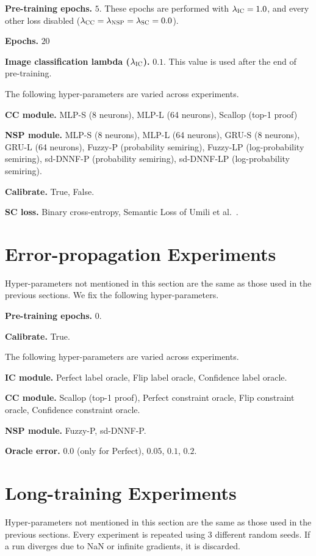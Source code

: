 \noindent\textbf{Pre-training epochs.} $5$. These epochs are performed with $\lambda_\textsc{IC} = 1.0$, and every other loss disabled ($\lambda_\textsc{CC} = \lambda_\textsc{NSP} = \lambda_\textsc{SC} = 0.0$).

\noindent\textbf{Epochs.} $20$

\noindent\textbf{Image classification lambda ($\lambda_\textsc{IC}$).} $0.1$. This value is used after the end of pre-training.


The following hyper-parameters are varied across experiments.

\noindent\textbf{\textsc{CC} module.} MLP-S (8 neurons), MLP-L (64 neurons), Scallop (top-1 proof)

\noindent\textbf{\textsc{NSP} module.} MLP-S (8 neurons), MLP-L (64 neurons), GRU-S (8 neurons), GRU-L (64 neurons), Fuzzy-P (probability semiring), Fuzzy-LP (log-probability semiring), sd-DNNF-P (probability semiring), sd-DNNF-LP (log-probability semiring).

\noindent\textbf{Calibrate.} True, False.

\noindent\textbf{\textsc{SC} loss.} Binary cross-entropy, Semantic Loss of Umili et al.~\cite{umili2023grounding}.




\section{Error-propagation Experiments}\label{app:abla}
Hyper-parameters not mentioned in this section are the same as those used in the previous sections.
We fix the following hyper-parameters.

\noindent\textbf{Pre-training epochs.} $0$.

\noindent\textbf{Calibrate.} True.

The following hyper-parameters are varied across experiments.

\noindent\textbf{\textsc{IC} module.} Perfect label oracle, Flip label oracle, Confidence label oracle.

\noindent\textbf{\textsc{CC} module.} Scallop (top-1 proof), Perfect constraint oracle, Flip constraint oracle, Confidence constraint oracle.

\noindent\textbf{\textsc{NSP} module.} Fuzzy-P, sd-DNNF-P.

\noindent\textbf{Oracle error.} $0.0$ (only for Perfect), $0.05$, $0.1$, $0.2$.




\section{Long-training Experiments}\label{app:seqhyper}
Hyper-parameters not mentioned in this section are the same as those used in the previous sections.
Every experiment is repeated using 3 different random seeds. If a run diverges due to NaN or infinite gradients, it is discarded.

